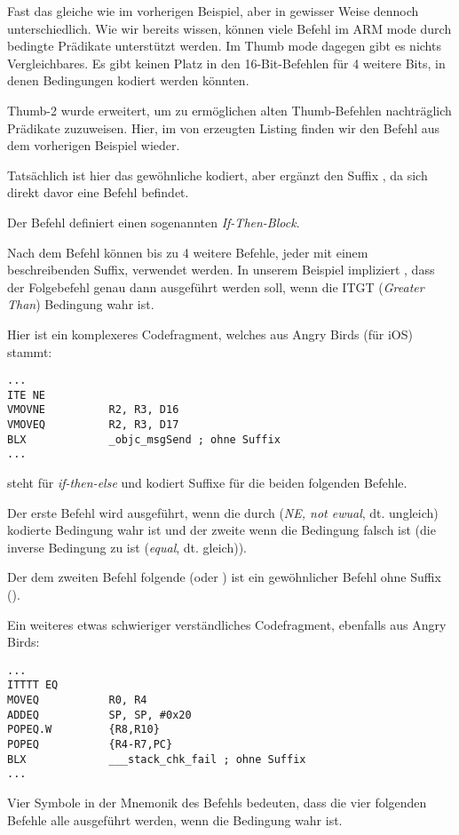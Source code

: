 Fast das gleiche wie im vorherigen Beispiel, aber in gewisser Weise dennoch unterschiedlich.
Wie wir bereits wissen, können viele Befehl im ARM mode durch bedingte Prädikate unterstützt werden.
Im Thumb mode dagegen gibt es nichts Vergleichbares.
Es gibt keinen Platz in den 16-Bit-Befehlen für 4 weitere Bits, in denen Bedingungen kodiert werden könnten.

Thumb-2 wurde erweitert, um zu ermöglichen alten Thumb-Befehlen nachträglich Prädikate zuzuweisen. Hier, im von \IDA
erzeugten Listing finden wir den  Befehl aus dem vorherigen Beispiel wieder.

Tatsächlich ist hier das gewöhnliche  kodiert, aber \IDA ergänzt den Suffix , da sich direkt davor
eine  Befehl befindet.

\label{ARM_Thumb_IT}
Der  Befehl definiert einen sogenannten \emph{If-Then-Block}.

Nach dem Befehl können bis zu 4 weitere Befehle, jeder mit einem beschreibenden Suffix, verwendet werden.
In unserem Beispiel impliziert , dass der Folgebefehl genau dann ausgeführt werden soll, wenn die IT{GT}
(\emph{Greater Than}) Bedingung wahr ist.

Hier ist ein komplexeres Codefragment, welches aus Angry Birds (für iOS) stammt:

\begin{lstlisting}[caption=Angry Birds Classic,style=customasmARM]
...
ITE NE
VMOVNE          R2, R3, D16
VMOVEQ          R2, R3, D17
BLX             _objc_msgSend ; ohne Suffix
...
\end{lstlisting}

 steht für \emph{if-then-else} und kodiert Suffixe für die beiden folgenden Befehle.

Der erste Befehl wird ausgeführt, wenn die durch  (\emph{NE, not ewual}, dt. ungleich) kodierte Bedingung wahr
ist und der zweite wenn die Bedingung falsch ist (die inverse Bedingung zu  ist  (\emph{equal}, dt.
gleich)).

Der dem zweiten Befehl folgende  (oder ) ist ein gewöhnlicher Befehl ohne Suffix ().

Ein weiteres etwas schwieriger verständliches Codefragment, ebenfalls aus Angry Birds:

\begin{lstlisting}[caption=Angry Birds Classic,style=customasmARM]
...
ITTTT EQ
MOVEQ           R0, R4
ADDEQ           SP, SP, #0x20
POPEQ.W         {R8,R10}
POPEQ           {R4-R7,PC}
BLX             ___stack_chk_fail ; ohne Suffix
...
\end{lstlisting}
Vier  Symbole in der Mnemonik des Befehls bedeuten, dass die vier folgenden Befehle alle ausgeführt werden, wenn
die Bedingung wahr ist. 

